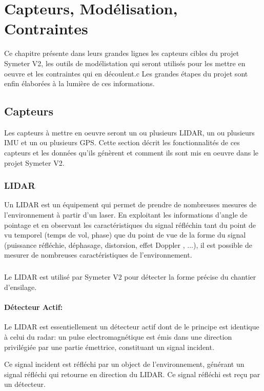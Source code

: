 \documentclass[12pt,a4paper]{report}
\begin{document}
\chapter{Capteurs, Modélisation, Contraintes}
	Ce chapitre présente dans leurs grandes lignes les capteurs cibles du projet Symeter V2, les outils de modélistation qui seront utilisés pour les mettre en oeuvre et les contraintes qui en découlent.c Les grandes étapes du projet sont enfin élaborées à la lumière de ces informations.
	
	\section{Capteurs}
		Les capteurs à mettre en oeuvre seront un ou plusieurs LIDAR, un ou plusieurs IMU et un ou plusieurs GPS. Cette section décrit les fonctionnalités de ces capteurs et les données qu'ils génèrent et comment ils sont mis en oeuvre dans le projet Symeter V2.
		
			
		\subsection{LIDAR}
		Un LIDAR est un équipement qui permet de prendre de nombreuses mesures de l'environnement à partir d'un laser. En exploitant les informations d'angle de pointage et en observant les caractéristiques du signal réfléchin tant du point de vu temporel (temps de vol, phase) que du point de vue de la forme du signal (puissance réfléchie, déphasage, distorsion, effet Doppler , ...), il est possible de mesurer de nombreuses caractéristiques de l'environnement.
		
		\paragraph*{} Le LIDAR est utilisé par Symeter V2 pour détecter la forme précise du chantier d'ensilage.
		
		\subsubsection{Détecteur Actif:}
		Le LIDAR est essentiellement un détecteur actif dont de le principe est identique à celui du radar: un pulse electromagnétique est émis dans une direction privilégiée par une partie émettrice, constituant un signal incident. 
		
		\para Ce signal incident est réfléchi par un object de l'environnement, générant un signal réfléchi qui retourne en direction du LIDAR. Ce signal réfléchi est reçu par un détecteur. 
		
\end{document}
